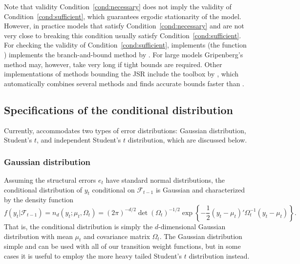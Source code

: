 \documentclass[nojss]{jss}
\begin{document}
Note that validity Condition~\ref{cond:necessary} does not imply the validity of Condition~\ref{cond:sufficient}, which guarantees ergodic stationarity of the model. However, in practice models that satisfy Condition~\ref{cond:necessary} and are not very close to breaking this condition usually satisfy Condition~\ref{cond:sufficient}. For checking the validity of Condition~\ref{cond:sufficient},  implements (the function ) implements the branch-and-bound method by \cite{Gripenberg:1996}. For large models Gripenberg's method may, however, take very long if tight bounds are required. Other implementations of methods bounding the JSR include the  toolbox  by \cite{Jungers:2023}, which automatically combines several methods and finds accurate bounds faster than .

\subsection{Specifications of the conditional distribution}\label{sec:cond_dist}
Currently,  accommodates two types of error distributions: Gaussian distribution, Student's $t$, and independent Student's $t$ distribution, which are discussed below.

\subsubsection{Gaussian distribution}
Assuming the structural errors $e_t$ have standard normal distributions, the conditional distribution of $y_t$ conditional on $\mathcal{F}_{t-1}$ is Gaussian and characterized by the density function
\begin{equation}
f(y_t|\mathcal{F}_{t-1}) = n_d(y_t;\mu_{t},\Omega_{t})=(2\pi)^{-d/2}\det(\Omega_t)^{-1/2}\exp\left\lbrace -\frac{1}{2}(y_t - \mu_t)'\Omega_t^{-1}(y_t - \mu_t) \right\rbrace .
\end{equation}
That is, the conditional distribution is simply the $d$-dimensional Gaussian distribution with mean $\mu_t$ and covariance matrix $\Omega_t$. The Gaussian distribution simple and can be used with all of our transition weight functions, but in some cases it is useful to employ the more heavy tailed Student's $t$ distribution instead.
\end{document}
